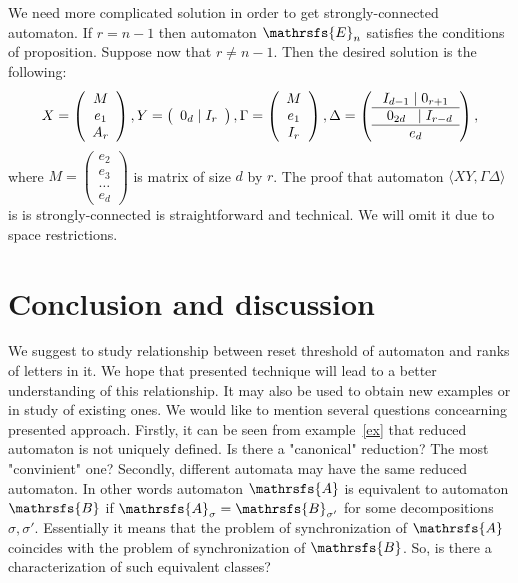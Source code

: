 \documentclass[11pt]{llncs}
\newcommand{\A}{\mathrsfs{A}}
\newcommand{\G}{\Gamma}
\newcommand{\D}{\Delta}
\begin{document}
We need more complicated solution in order to get strongly-connected automaton.
If $r = n - 1$ then automaton $\mathrsfs{E}_n$ satisfies the conditions of proposition.
Suppose now that $r \neq n - 1$.
Then the desired solution is the following:
$$
X =
\left(
\begin{array}{c}
M \\
e_1 \\
A_r
\end{array}
\right),
Y = 
\left(
\begin{array}{c}
0_d \mid I_r
\end{array}
\right),
\G = 
\left(
\begin{array}{c}
M \\
e_1 \\
I_r
\end{array}
\right),
\D = 
\left(
\begin{array}{c}
I_{d - 1} \mid 0_{r + 1} \\ \hline
\textbf{\,\,\,} 0_{2d} \textbf{\,\,\,} \mid I_{r - d} \\ \hline
e_d
\end{array}
\right),
$$
where $M =
\left(
\begin{smallmatrix}
e_2\\
e_3\\
\ldots\\
e_d
\end{smallmatrix}\right)$ is matrix of size $d$ by $r$.
The proof that automaton $\langle XY, \G\D\rangle$ is is strongly-connected is
straightforward and technical. We will omit it due to space restrictions.

\section{Conclusion and discussion}
We suggest to study relationship between reset threshold of automaton and ranks of letters in it.
We hope that presented technique will lead to a better understanding of this relationship. 
It may also be used to obtain 
new examples or in study of existing ones.
We would like to mention several questions concearning presented approach.
Firstly, it can be seen from example~\ref{ex} that reduced automaton is not uniquely defined. 
Is there a "canonical" reduction? The most "convinient" one?
Secondly, different automata may have the same reduced automaton. In other words automaton $\A$ 
is equivalent to automaton $\mathrsfs{B}$ if $\mathrsfs{A}_{\sigma} = \mathrsfs{B}_{\sigma'}$ for
some decompositions $\sigma, \sigma'$. Essentially it means that the problem of synchronization of $\A$ 
coincides with the problem of synchronization of $\mathrsfs{B}$. So, is there a characterization of
such equivalent classes?
\end{document}

